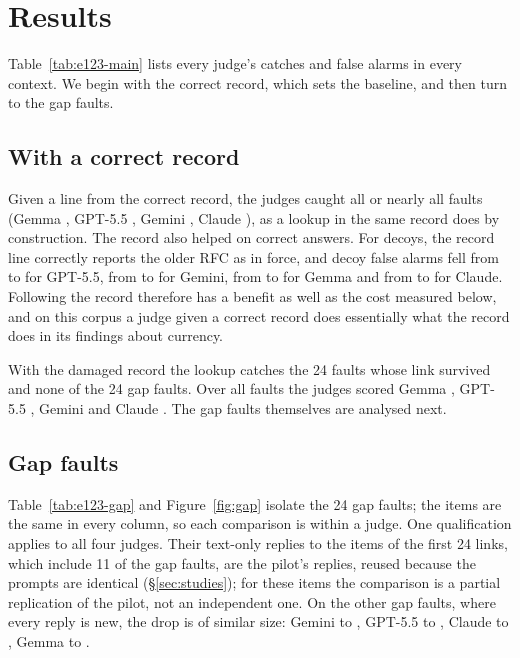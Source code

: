 \section{Results}
\label{sec:results}

Table~\ref{tab:e123-main} lists every judge's catches and false alarms in every context. We begin with the correct
record, which sets the baseline, and then turn to the gap faults.


\subsection{With a correct record}
\label{sec:res-correct}

Given a line from the correct record, the judges caught all or nearly all faults (Gemma \EGemmaCatchRecord, GPT-5.5
\EGPTCatchRecord, Gemini \EGeminiCatchRecord, Claude \EOpusCatchRecord), as a lookup in the same record does by
construction. The record also helped on correct answers. For decoys, the record line correctly reports the older RFC as
in force, and decoy false alarms fell from \EGPTDecoyFATexts{} to \EGPTDecoyFARecord{} for GPT-5.5, from
\EGeminiDecoyFATexts{} to \EGeminiDecoyFARecord{} for Gemini, from \EGemmaDecoyFATexts{} to \EGemmaDecoyFARecord{} for Gemma and from \EOpusDecoyFATexts{} to \EOpusDecoyFARecord{} for
Claude. Following the record therefore has a benefit as well as the cost measured below, and on this corpus a judge
given a correct record does essentially what the record does in its findings about currency.

With the damaged record the lookup catches the 24 faults whose link survived and none of the 24 gap faults. Over all
\ENLinks{} faults the judges scored Gemma \EGemmaCatchDamaged, GPT-5.5 \EGPTCatchDamaged, Gemini \EGeminiCatchDamaged{}
and Claude \EOpusCatchDamaged. The gap faults themselves are analysed next.

\subsection{Gap faults}
\label{sec:res-gaps}

Table~\ref{tab:e123-gap} and Figure~\ref{fig:gap} isolate the 24 gap faults; the items are the same in every column, so each comparison is
within a judge. One qualification applies to all four judges. Their text-only replies to the items of the
first 24 links, which include 11 of the gap faults, are the pilot's replies, reused because the prompts are identical
(\S\ref{sec:studies}); for these items the comparison is a partial replication of the pilot, not an independent one.
On the other \EGPTFreshN{} gap faults, where every reply is new, the drop is of similar size: Gemini
\EGeminiFreshOwn{} to \EGeminiFreshWithRecord, GPT-5.5 \EGPTFreshOwn{} to \EGPTFreshWithRecord, Claude \EOpusFreshOwn{}
to \EOpusFreshWithRecord, Gemma \EGemmaFreshOwn{} to \EGemmaFreshWithRecord.

